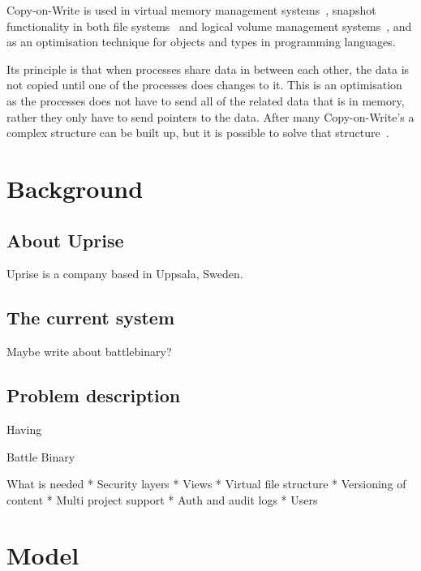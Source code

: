 \documentclass[a4paper,12pt]{article}
\begin{document}
Copy-on-Write is used in virtual memory management systems~\cite{VIRTCOW}, snapshot functionality in both file 
systems~\cite{FSCOW} and logical volume management systems~\cite{LVMCOW}, and as an optimisation technique for objects and 
types in programming languages\cite{LANGCOW}.

Its principle is that when processes share data in between each other, the data is not copied until one of the processes 
does changes to it. This is an optimisation as the processes does not have to send all of the related data that is in memory, 
rather they only have to send pointers to the data. After many Copy-on-Write's a complex structure can be built up, 
but it is possible to solve that structure~\cite{COPYONWRITE2}.



\section{Background}
\subsection{About Uprise}
Uprise is a company based in Uppsala, Sweden. 

\subsection{The current system}
Maybe write about battlebinary?  

\subsection{Problem description}
Having
  
Battle Binary

What is needed
* Security layers
* Views
* Virtual file structure
* Versioning of content
* Multi project support
* Auth and audit logs
* Users
\newpage 
\section{Model}
\end{document}
